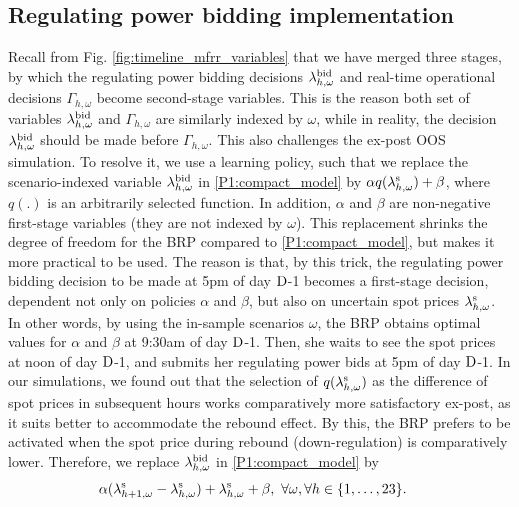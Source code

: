 \subsection{Regulating power bidding implementation}\label{sec:mFRR_bidding_implementation}
Recall from  Fig. \ref{fig:timeline_mfrr_variables} that we have merged three stages, by which the regulating power bidding decisions $\lambda_{h,\omega}^{\rm{bid}}$ and real-time operational decisions $\Gamma_{h,\omega}$ become second-stage variables. This is the reason both set of variables $\lambda_{h,\omega}^{\rm{bid}}$ and $\Gamma_{h,\omega}$ are similarly indexed by $\omega$, while in reality, the decision $\lambda_{h,\omega}^{\rm{bid}}$ should be made before $\Gamma_{h,\omega}$. This also challenges the ex-post OOS simulation. To resolve it, we use a learning policy, such that we replace the scenario-indexed variable $\lambda_{h,\omega}^{\rm{bid}}$ in \eqref{P1:compact_model} by $\alpha q(\lambda_{h,\omega}^{\rm{s}}) + \beta$, where $q(.)$ is an arbitrarily selected function. In addition, $\alpha$ and $\beta$ are non-negative first-stage  variables (they are not indexed by $\omega$). This replacement shrinks the degree of freedom for the BRP compared to \eqref{P1:compact_model}, but makes it more practical to be used. The reason is that, by this trick, the regulating power bidding decision to be made at 5pm of day $\rm{D}$-1 becomes a first-stage decision, dependent not only on policies $\alpha$ and $\beta$, but also on uncertain spot prices $\lambda_{h,\omega}^{\rm{s}}$. In other words, by using the in-sample scenarios $\omega$, the BRP obtains optimal values for $\alpha$ and $\beta$ at 9:30am of day $\rm{D}$-1. Then, she waits to see the spot prices at noon of day $\rm{D}$-1, and  submits her regulating power bids at 5pm of day $\rm{D}$-1. In our simulations, we found out that the selection of $q(\lambda_{h,\omega}^{\rm{s}})$ as the difference of spot prices in subsequent hours works comparatively more satisfactory ex-post, as it suits better to accommodate the rebound effect. By this, the BRP prefers to be activated when the spot price during rebound (down-regulation) is comparatively lower. Therefore, we replace $\lambda_{h,\omega}^{\rm{bid}}$ in \eqref{P1:compact_model} by
%
\begin{align}\label{eq:affine_policy}
     & \alpha ( \lambda_{h+1,\omega}^{\rm{s}} - \lambda_{h,\omega}^{\rm{s}}) + \lambda_{h,\omega}^{\rm{s}} + \beta, \ \forall{\omega}, \forall{h} \in \{1, \ldots, 23\}.
\end{align}



